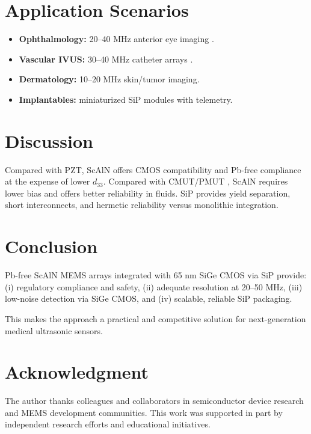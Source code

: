 \documentclass[conference]{IEEEtran}
\begin{document}
\section{Application Scenarios}
\begin{itemize}
  \item \textbf{Ophthalmology:} 20--40 MHz anterior eye imaging \cite{pavlin2009ubm}.
  \item \textbf{Vascular IVUS:} 30--40 MHz catheter arrays \cite{foster2000ivus}.
  \item \textbf{Dermatology:} 10--20 MHz skin/tumor imaging.
  \item \textbf{Implantables:} miniaturized SiP modules with telemetry.
\end{itemize}

\section{Discussion}
Compared with PZT, ScAlN offers CMOS compatibility and Pb-free compliance at the expense of lower $d_{33}$.  
Compared with CMUT/PMUT \cite{khuri2009cmut}, ScAlN requires lower bias and offers better reliability in fluids.  
SiP provides yield separation, short interconnects, and hermetic reliability versus monolithic integration.

\section{Conclusion}
Pb-free ScAlN MEMS arrays integrated with 65 nm SiGe CMOS via SiP provide:  
(i) regulatory compliance and safety,  
(ii) adequate resolution at 20--50 MHz,  
(iii) low-noise detection via SiGe CMOS, and  
(iv) scalable, reliable SiP packaging.  

This makes the approach a practical and competitive solution for next-generation medical ultrasonic sensors.

\section*{Acknowledgment}
The author thanks colleagues and collaborators in semiconductor device research and MEMS development communities. 
This work was supported in part by independent research efforts and educational initiatives.



\nocite{akata2009pzt,akrout2018scaln,khuri2009cmut,foster2000ivus,pavlin2009ubm}
\end{document}

